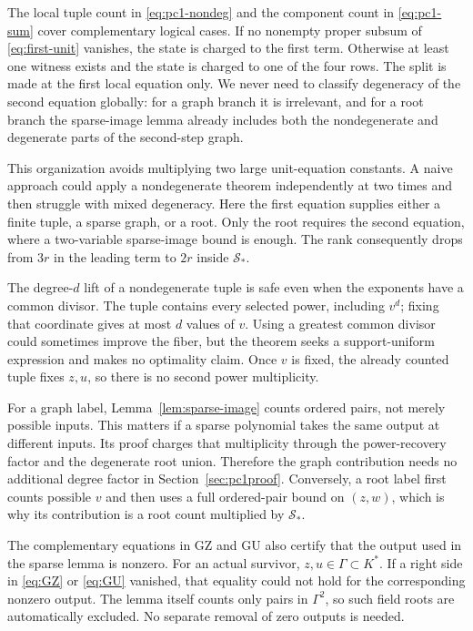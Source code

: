 \documentclass[11pt]{article}
\theoremstyle{definition}
\newcommand{\Scal}{\mathcal S}
\begin{document}
The local tuple count in \eqref{eq:pc1-nondeg} and the component count in \eqref{eq:pc1-sum} cover complementary logical cases. If no nonempty proper subsum of \eqref{eq:first-unit} vanishes, the state is charged to the first term. Otherwise at least one witness exists and the state is charged to one of the four rows. The split is made at the first local equation only. We never need to classify degeneracy of the second equation globally: for a graph branch it is irrelevant, and for a root branch the sparse-image lemma already includes both the nondegenerate and degenerate parts of the second-step graph.

This organization avoids multiplying two large unit-equation constants. A naive approach could apply a nondegenerate theorem independently at two times and then struggle with mixed degeneracy. Here the first equation supplies either a finite tuple, a sparse graph, or a root. Only the root requires the second equation, where a two-variable sparse-image bound is enough. The rank consequently drops from \(3r\) in the leading term to \(2r\) inside \(\Scal_*\).

The degree-\(d\) lift of a nondegenerate tuple is safe even when the exponents have a common divisor. The tuple contains every selected power, including \(v^d\); fixing that coordinate gives at most \(d\) values of \(v\). Using a greatest common divisor could sometimes improve the fiber, but the theorem seeks a support-uniform expression and makes no optimality claim. Once \(v\) is fixed, the already counted tuple fixes \(z,u\), so there is no second power multiplicity.

For a graph label, Lemma~\ref{lem:sparse-image} counts ordered pairs, not merely possible inputs. This matters if a sparse polynomial takes the same output at different inputs. Its proof charges that multiplicity through the power-recovery factor and the degenerate root union. Therefore the graph contribution needs no additional degree factor in Section~\ref{sec:pc1proof}. Conversely, a root label first counts possible \(v\) and then uses a full ordered-pair bound on \((z,w)\), which is why its contribution is a root count multiplied by \(\Scal_*\).

The complementary equations in GZ and GU also certify that the output used in the sparse lemma is nonzero. For an actual survivor, \(z,u\in\Gamma\subset K^*\). If a right side in \eqref{eq:GZ} or \eqref{eq:GU} vanished, that equality could not hold for the corresponding nonzero output. The lemma itself counts only pairs in \(\Gamma^2\), so such field roots are automatically excluded. No separate removal of zero outputs is needed.
\end{document}
